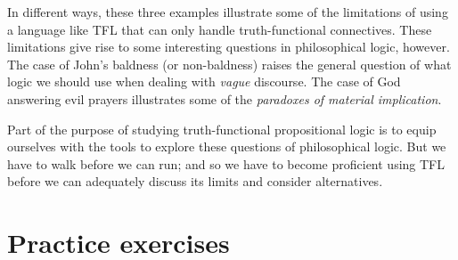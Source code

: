 In different ways, these three examples illustrate some of the limitations of using a language like TFL that can only handle truth-functional connectives. These limitations give rise to some interesting questions in philosophical logic, however. The case of John's baldness (or non-baldness) raises the general question of what logic we should use when dealing with \emph{vague} discourse. The case of God answering evil prayers illustrates some of the \emph{paradoxes of material implication}. 

Part of the purpose of studying truth-functional propositional logic is to equip ourselves with the tools to explore these questions of philosophical logic. But we have to walk before we can run; and  so we have to become proficient using TFL before we can adequately discuss its limits and consider alternatives. 







\section{Practice exercises}
\setcounter{ProbPart}{0}

